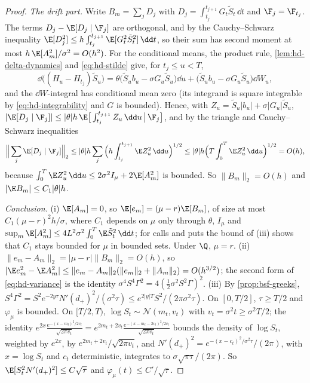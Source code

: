 \begin{proof}
\emph{The drift part.} Write $B_m=\sum_jD_j$ with $D_j=\int_{t_j}^{t_{j+1}}G_t\tilde S_t\,\dd t$ and
$\F_j=\F_{t_j}$. The terms $D_j-\E[D_j\mid\F_j]$ are orthogonal, and by the Cauchy--Schwarz
inequality $\E[D_j^2]\le h\int_{t_j}^{t_{j+1}}\E[G_t^2\tilde S_t^2]\,\dd t$, so their sum has second
moment at most $h\,\E[A_m^2]/\sigma^2=O(h^2)$. For the conditional means, the product rule,
\cref{lem:hd-delta-dynamics} and \eqref{eq:hd-stilde} give, for $t_j\le u<T$,
\[
  \dd\big((H_u-H_{t_j})\tilde S_u\big)=\theta\big(\tilde S_ub_u-\sigma G_u\tilde S_u\big)\dd u
  +\big(\tilde S_ub_u-\sigma G_u\tilde S_u\big)\dd W_u ,
\]
and the $\dd W$-integral has conditional mean zero (its integrand is square integrable by
\eqref{eq:hd-integrability} and $G$ is bounded). Hence, with $Z_u=\tilde S_u|b_u|+\sigma|G_u|\tilde S_u$,
$|\E[D_j\mid\F_j]|\le|\theta|h\,\E\big[\int_{t_j}^{t_{j+1}}Z_u\,\dd u\,\big|\,\F_j\big]$, and by the
triangle and Cauchy--Schwarz inequalities
\[
  \Big\|\sum_j\E[D_j\mid\F_j]\Big\|_2\le|\theta|h\sum_j\Big(h\int_{t_j}^{t_{j+1}}\E Z_u^2\,\dd u\Big)^{1/2}
  \le|\theta|h\Big(T\int_0^T\E Z_u^2\,\dd u\Big)^{1/2}=O(h),
\]
because $\int_0^T\E Z_u^2\,\dd u\le2\sigma^2I_\mu+2\E[A_m^2]$ is bounded. So $\|B_m\|_2=O(h)$ and
$|\E B_m|\le C_1|\theta|h$.

\emph{Conclusion.} (i) $\E[A_m]=0$, so $\E[e_m]=(\mu-r)\E[B_m]$, of size at most
$C_1(\mu-r)^2h/\sigma$, where $C_1$ depends on $\mu$ only through $\theta$, $I_\mu$ and
$\sup_m\E[A_m^2]\le4L^2\sigma^2\int_0^T\E\tilde S_t^2\,\dd t$; for calls and puts the bound of (iii) shows that
$C_1$ stays bounded for $\mu$ in bounded sets. Under $\Q$, $\mu=r$. (ii) $\|e_m-A_m\|_2=|\mu-r|\|B_m\|_2=O(h)$, so
$|\E e_m^2-\E A_m^2|\le\|e_m-A_m\|_2(\|e_m\|_2+\|A_m\|_2)=O(h^{3/2})$; the second form of
\eqref{eq:hd-variance} is the identity $\sigma^4S^4\Gamma^2=4(\frac12\sigma^2S^2\Gamma)^2$. (iii) By
\cref{prop:bsf-greeks}, $S^4\Gamma^2=S^2e^{-2y\tau}N'(d_+)^2/(\sigma^2\tau)\le e^{2|y|T}S^2/(2\pi\sigma^2\tau)$. On $[0,T/2]$, $\tau\ge T/2$
and $\varphi_\mu$ is bounded. On $[T/2,T)$, $\log S_t\sim\mathcal N(m_t,v_t)$ with
$v_t=\sigma^2t\ge\sigma^2T/2$; the identity $e^{2x}\frac{e^{-(x-m_t)^2/2v_t}}{\sqrt{2\pi v_t}}
=e^{2m_t+2v_t}\frac{e^{-(x-m_t-2v_t)^2/2v_t}}{\sqrt{2\pi v_t}}$ bounds the density of $\log S_t$,
weighted by $e^{2x}$, by $e^{2m_t+2v_t}/\sqrt{2\pi v_t}$, and $N'(d_+)^2=e^{-(x-c_t)^2/\sigma^2\tau}/(2\pi)$,
with $x=\log S_t$ and $c_t$ deterministic, integrates to $\sigma\sqrt{\pi\tau}/(2\pi)$. So
$\E[S_t^2N'(d_+)^2]\le C\sqrt\tau$ and $\varphi_\mu(t)\le C'/\sqrt\tau$.
\end{proof}

